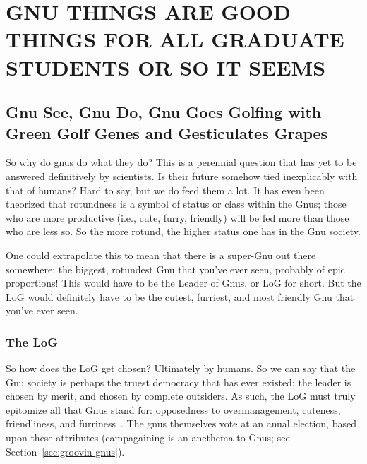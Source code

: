 %
%
%
%
%
%
%
%
%
%

%
%

\chapter{GNU THINGS ARE GOOD THINGS FOR ALL GRADUATE STUDENTS OR SO IT SEEMS}
\label{chap:golfing}

\section{Gnu See, Gnu Do, Gnu Goes Golfing with Green Golf Genes and
  Gesticulates Grapes}

So why do gnus do what they do?  This is a perennial question that has
yet to be answered definitively by scientists.  Is their future
somehow tied inexplicably with that of humans?  Hard to say, but we do
feed them a lot.  It has even been theorized that rotundness is a
symbol of status or class within the Gnus; those who are more
productive (i.e., cute, furry, friendly) will be fed more than those
who are less so.  So the more rotund, the higher status one has in the
Gnu society.

One could extrapolate this to mean that there is a super-Gnu out there
somewhere; the biggest, rotundest Gnu that you've ever seen, probably
of epic proportions!  This would have to be the Leader of Gnus, or LoG
for short.  But the LoG would definitely have to be the cutest,
furriest, and most friendly Gnu that you've ever seen.

\subsection{The LoG}

So how does the LoG get chosen?  Ultimately by humans.  So we can say
that the Gnu society is perhaps the truest democracy that has ever
existed; the leader is chosen by merit, and chosen by complete
outsiders.  As such, the LoG must truly epitomize all that Gnus stand
for: opposedness to overmanagement, cuteness, friendliness, and
furriness~\citep{gloonson98:_gnuly_discov_gnus}.  The gnus themselves
vote at an anual election, based upon these attributes (campagaining
is an anethema to Gnus; see Section~\ref{sec:groovin-gnus}).

